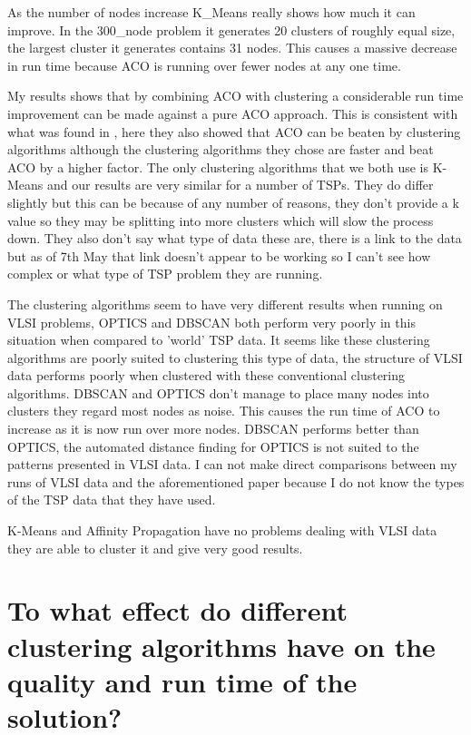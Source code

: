 As the number of nodes increase K\_Means really shows how much it can improve. In the 300\_node problem it generates 20 clusters of roughly equal size, the largest cluster it generates contains 31 nodes. This causes a massive decrease in run time because ACO is running over fewer nodes at any one time.

My results shows that by combining ACO with clustering a considerable run time improvement can be made against a pure ACO approach. This is consistent with what was found in \cite{pang_chao-yang_ben-qiong_zhang_jie_wei_shan_zheng-chao_2014}, here they also showed that ACO can be beaten by clustering algorithms although the clustering algorithms they chose are faster and beat ACO by a higher factor. The only clustering algorithms that we both use is K-Means and our results are very similar for a number of TSPs. They do differ slightly but this can be because of any number of reasons, they don't provide a k value so they may be splitting into more clusters which will slow the process down. They also don't say what type of data these are, there is a link to the data but as of 7th May that link doesn't appear to be working so I can't see how complex or what type of TSP problem they are running.

The clustering algorithms seem to have very different results when running on VLSI problems, OPTICS and DBSCAN both perform very poorly in this situation when compared to 'world' TSP data. It seems like these clustering algorithms are poorly suited to clustering this type of data, the structure of VLSI data performs poorly when clustered with these conventional clustering algorithms. DBSCAN and OPTICS don't manage to place many nodes into clusters they regard most nodes as noise. This causes the run time of ACO to increase as it is now run over more nodes. DBSCAN performs better than OPTICS, the automated distance finding for OPTICS is not suited to the patterns presented in VLSI data. I can not make direct comparisons between my runs of VLSI data and the aforementioned paper because I do not know the types of the TSP data that they have used.

K-Means and Affinity Propagation have no problems dealing with VLSI data they are able to cluster it and give very good results.

\section{To what effect do different clustering algorithms have on the quality and run time of the solution?}\label{sec:question2}

